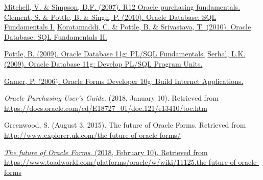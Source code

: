 \documentclass[12pt]{report} %
\begin{document}
\pagestyle{empty}
\setcounter{page}{0}
\renewcommand\bibname{References} %
\begin{thebibliography}{1}
    \hyperref[sec:purchase_module_book_1]{Mitchell, V. \& Simpson, D.F. (2007). R12 Oracle purchasing fundamentals.} 
   \hyperref[sec:sql_book_1]{Clement, S. \& Pottle, B. \& Singh, P. (2010). Oracle Database: SQL Fundamentals I.}
   \hyperref[sec:sql_book_1]{Koratamaddi, C. \& Pottle, B. \& Srivastava, T. (2010). Oracle Database: SQL Fundamentals II.}
  
   \hyperref[sec:plsql_book_1]{Pottle, B. (2009). Oracle Database 11g: PL/SQL Fundamentals.}
   \hyperref[sec:plsql_book_1]{Serhal, L.K. (2009). Oracle Database 11g: Develop PL/SQL Program Units.}
  
    \hyperref[sec:form_builder_book_1]{Gamer, P. (2006). Oracle Forms Developer 10g: Build Internet Applications.}
  
   \textit{Oracle Purchasing User's Guide}. (2018, January 10). Retrieved  from  {\url{https://docs.oracle.com/cd/E18727_01/doc.121/e13410/toc.htm}}
  
   Greenwood, S. (August 3, 2015). The future of Oracle Forms. Retrieved  from  {\url{http://www.explorer.uk.com/the-future-of-oracle-forms/}}
  
   \hyperref[sec:feature_forms_1]{ \textit{The future of Oracle Forms}. (2018, February 10). Retrieved  from  {\url{https://www.toadworld.com/platforms/oracle/w/wiki/11125.the-future-of-oracle-forms}} }
  
  




  \end{thebibliography}
  

 \thispagestyle{empty}    %
\clearpage

\end{document}
